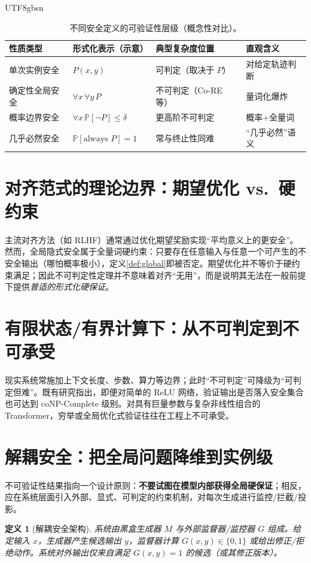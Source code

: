 \documentclass[letterpaper,twocolumn,10pt]{article}
\newtheorem{definition}{定义}
\newcommand{\Prob}{\mathbb{P}}
\begin{document}
\begin{CJK}{UTF8}{gbsn}
\begin{table}[t]
\centering
\small
\begin{tabular}{@{}llll@{}}
\toprule
性质类型 & 形式化表示（示意） & 典型复杂度位置 & 直观含义 \\
\midrule
单次实例安全 & $P(x,y)$ & 可判定（取决于 $P$） & 对给定轨迹判断 \\
确定性全局安全 & $\forall x\,\forall y\,P$ & 不可判定（Co-RE 等） & 量词化爆炸 \\
概率边界安全 & $\forall x\,\Prob[\neg P]\le\delta$ & 更高阶不可判定 & 概率+全量词 \\
几乎必然安全 & $\Prob[\text{always }P]=1$ & 常与终止性同难 & “几乎必然”语义 \\
\bottomrule
\end{tabular}
\vspace{-0.5em}
\caption{不同安全定义的可验证性层级（概念性对比）。}
\label{tab:hierarchy}
\end{table}

\section{对齐范式的理论边界：期望优化 vs.\ 硬约束}
主流对齐方法（如 RLHF）通常通过优化期望奖励实现“平均意义上的更安全”。然而，全局隐式安全属于全量词硬约束：只要存在任意输入与任意一个可产生的不安全输出（哪怕概率极小），定义\ref{def:global}即被否定。期望优化并不等价于硬约束满足；因此不可判定性定理并不意味着对齐“无用”，而是说明其无法在一般前提下提供\emph{普适的形式化硬保证}。

\section{有限状态/有界计算下：从不可判定到不可承受}
现实系统常施加上下文长度、步数、算力等边界；此时“不可判定”可降级为“可判定但难”。既有研究指出，即便对简单的 ReLU 网络，验证输出是否落入安全集合也可达到 coNP-Complete 级别。对具有巨量参数与复杂非线性组合的 Transformer，穷举或全局优化式验证往往在工程上不可承受。

\section{解耦安全：把全局问题降维到实例级}\label{sec:decoupled}
不可验证性结果指向一个设计原则：\textbf{不要试图在模型内部获得全局硬保证}；相反，应在系统层面引入外部、显式、可判定的约束机制，对每次生成进行监控/拦截/投影。

\begin{definition}[解耦安全架构]\label{def:decouple}
系统由黑盒生成器 $M$ 与外部监督器/监控器 $G$ 组成。给定输入 $x$，生成器产生候选输出 $y$，监督器计算 $G(x,y)\in\{0,1\}$ 或给出修正/拒绝动作。系统对外输出仅来自满足 $G(x,y)=1$ 的候选（或其修正版本）。
\end{definition}


\end{CJK}
\end{document}
